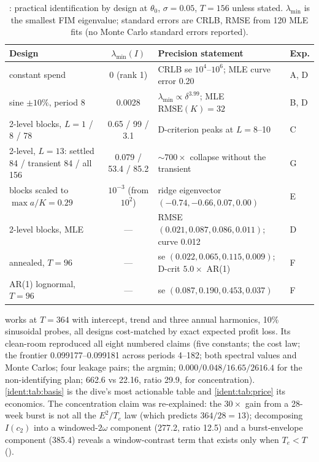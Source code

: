 \begin{table}[htbp]
\centering\footnotesize
\caption{: practical identification by design at $\theta_0$, $\sigma = 0.05$, $T = 156$ unless stated. $\lambda_{\min}$ is the smallest FIM eigenvalue; standard errors are CRLB, RMSE from 120 MLE fits (no Monte Carlo standard errors reported).}
\label{ident:tab:designs}
\begin{tabularx}{\textwidth}{lcXl}
\toprule
Design & $\lambda_{\min}(I)$ & Precision statement & Exp. \\
\midrule
constant spend & 0 (rank 1) & CRLB se $10^4$--$10^6$; MLE curve error 0.20 & A, D \\
sine $\pm10\%$, period 8 & 0.0028 & $\lambda_{\min} \propto \delta^{3.99}$; MLE $\mathrm{RMSE}(K) = 32$ & B, D \\
2-level blocks, $L = 1$ / 8 / 78 & 0.65 / 99 / 3.1 & D-criterion peaks at $L = 8$--10 & C \\
2-level, $L = 13$: settled 84 / transient 84 / all 156 & 0.079 / 53.4 / 85.2 & $\sim700\times$ collapse without the transient & G \\
blocks scaled to $\max a/K = 0.29$ & $10^{-3}$ (from $10^2$) & ridge eigenvector $(-0.74, -0.66, 0.07, 0.00)$ & E \\
2-level blocks, MLE & --- & RMSE $(0.021, 0.087, 0.086, 0.011)$; curve 0.012 & D \\
annealed, $T = 96$ & --- & se $(0.022, 0.065, 0.115, 0.009)$; D-crit $5.0\times$ AR(1) & F \\
AR(1) lognormal, $T = 96$ & --- & se $(0.087, 0.190, 0.453, 0.037)$ & F \\
\bottomrule
\end{tabularx}
\end{table}

\emph{} works at $T = 364$ with intercept, trend and three annual harmonics, 10\% sinusoidal probes, all designs cost-matched by exact expected profit loss. Its clean-room reproduced all eight numbered claims (five constants; the cost law; the frontier 0.099177--0.099181 across periods 4--182; both spectral values and Monte Carlos; four leakage pairs; the argmin; $0.000/0.048/16.65/2616.4$ for the non-identifying plan; 662.6 vs 22.16, ratio 29.9, for concentration). \cref{ident:tab:basis} is the dive's most actionable table and \cref{ident:tab:price} its economics. The concentration claim was re-explained: the $30\times$ gain from a 28-week burst is not all the $E^2/T_e$ law (which predicts $364/28 = 13$); decomposing $I(c_2)$ into a windowed-$2\omega$ component (277.2, ratio 12.5) and a burst-envelope component (385.4) reveals a window-contrast term that exists only when $T_e < T$ ().

